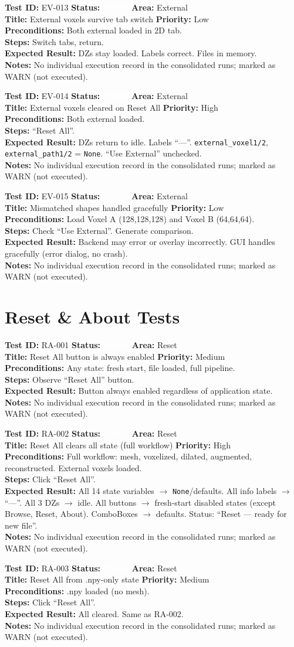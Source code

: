 \documentclass[12pt,a4paper]{article}
\newcommand{\statuspass}{\colorbox{statusgreen}{\textcolor{white}{\textbf{\,PASS\,}}}}
\newcommand{\testcase}[9]{%
  \smallskip
  \noindent\textbf{Test ID:} #1 \hfill \textbf{Status:} #2 \hfill \textbf{Area:} #3 \\
  \textbf{Title:} #4 \hfill \textbf{Priority:} #5 \\[0.3em]
  \textbf{Preconditions:} #6 \\[0.3em]
  \textbf{Steps:} #7 \\[0.3em]
  \textbf{Expected Result:} #8 \\
  \textbf{Notes:} #9
  \smallskip
}
\begin{document}
\testcase{EV-013}{\statuspass}{External}{External voxels survive tab switch}{Low}{Both external loaded in 2D tab.}{Switch tabs, return.}{DZs stay loaded. Labels correct. Files in memory.}{No individual execution record in the consolidated runs; marked as WARN (not executed).}


\testcase{EV-014}{\statuspass}{External}{External voxels cleared on Reset All}{High}{Both external loaded.}{``Reset All''.}{DZs return to idle. Labels ``---''. \texttt{external\_voxel1/2}, \texttt{external\_path1/2} = \texttt{None}. ``Use External'' unchecked.}{No individual execution record in the consolidated runs; marked as WARN (not executed).}


\testcase{EV-015}{\statuspass}{External}{Mismatched shapes handled gracefully}{Low}{Load Voxel A (128,128,128) and Voxel B (64,64,64).}{Check ``Use External''. Generate comparison.}{Backend may error or overlay incorrectly. GUI handles gracefully (error dialog, no crash).}{No individual execution record in the consolidated runs; marked as WARN (not executed).}



\section{Reset \& About Tests}

\testcase{RA-001}{\statuspass}{Reset}{Reset All button is always enabled}{Medium}{Any state: fresh start, file loaded, full pipeline.}{Observe ``Reset All'' button.}{Button always enabled regardless of application state.}{No individual execution record in the consolidated runs; marked as WARN (not executed).}


\testcase{RA-002}{\statuspass}{Reset}{Reset All clears all state (full workflow)}{High}{Full workflow: mesh, voxelized, dilated, augmented, reconstructed. External voxels loaded.}{Click ``Reset All''.}{All 14 state variables $\rightarrow$ \texttt{None}/defaults. All info labels $\rightarrow$ ``---''. All 3 DZs $\rightarrow$ idle. All buttons $\rightarrow$ fresh-start disabled states (except Browse, Reset, About). ComboBoxes $\rightarrow$ defaults. Status: ``Reset --- ready for new file''.}{No individual execution record in the consolidated runs; marked as WARN (not executed).}


\testcase{RA-003}{\statuspass}{Reset}{Reset All from .npy-only state}{Medium}{.npy loaded (no mesh).}{Click ``Reset All''.}{All cleared. Same as RA-002.}{No individual execution record in the consolidated runs; marked as WARN (not executed).}
\end{document}
